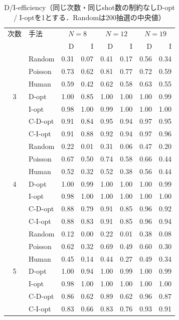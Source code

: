 \documentclass[10.5pt,a4paper]{ltjsarticle}
\begin{document}
\begin{table}[htbp]
  \centering
  \caption{D/I-efficiency（同じ次数・同じshot数の制約なしD-opt / I-optを1とする．Randomは200抽選の中央値）}
  \label{tab:eff}
  \small
\begin{tabular}{clrrrrrr}
\toprule
次数 & 手法 & \multicolumn{2}{c}{$N=8$} & \multicolumn{2}{c}{$N=12$} & \multicolumn{2}{c}{$N=19$} \\
 & & D & I & D & I & D & I \\
\midrule
\multirow{7}{*}{3} & Random & 0.31 & 0.07 & 0.41 & 0.17 & 0.56 & 0.34 \\
 & Poisson & 0.73 & 0.62 & 0.81 & 0.77 & 0.72 & 0.59 \\
 & Human & 0.59 & 0.42 & 0.62 & 0.58 & 0.63 & 0.55 \\
 & D-opt & 1.00 & 0.85 & 1.00 & 1.00 & 1.00 & 0.99 \\
 & I-opt & 0.98 & 1.00 & 0.99 & 1.00 & 1.00 & 1.00 \\
 & C-D-opt & 0.91 & 0.84 & 0.95 & 0.94 & 0.97 & 0.95 \\
 & C-I-opt & 0.91 & 0.88 & 0.92 & 0.94 & 0.97 & 0.96 \\
\midrule
\multirow{7}{*}{4} & Random & 0.22 & 0.01 & 0.31 & 0.06 & 0.47 & 0.20 \\
 & Poisson & 0.67 & 0.50 & 0.74 & 0.58 & 0.66 & 0.44 \\
 & Human & 0.52 & 0.32 & 0.52 & 0.38 & 0.56 & 0.44 \\
 & D-opt & 1.00 & 0.99 & 1.00 & 1.00 & 1.00 & 0.99 \\
 & I-opt & 0.98 & 1.00 & 1.00 & 1.00 & 1.00 & 1.00 \\
 & C-D-opt & 0.88 & 0.79 & 0.91 & 0.85 & 0.96 & 0.92 \\
 & C-I-opt & 0.88 & 0.83 & 0.91 & 0.85 & 0.96 & 0.94 \\
\midrule
\multirow{7}{*}{5} & Random & 0.12 & 0.00 & 0.22 & 0.01 & 0.38 & 0.08 \\
 & Poisson & 0.62 & 0.32 & 0.69 & 0.49 & 0.60 & 0.30 \\
 & Human & 0.45 & 0.14 & 0.44 & 0.27 & 0.49 & 0.34 \\
 & D-opt & 1.00 & 0.94 & 1.00 & 0.99 & 1.00 & 0.99 \\
 & I-opt & 0.98 & 1.00 & 1.00 & 1.00 & 1.00 & 1.00 \\
 & C-D-opt & 0.86 & 0.62 & 0.89 & 0.62 & 0.96 & 0.87 \\
 & C-I-opt & 0.83 & 0.66 & 0.83 & 0.76 & 0.93 & 0.91 \\
\bottomrule
\end{tabular}
\end{table}
\end{document}
